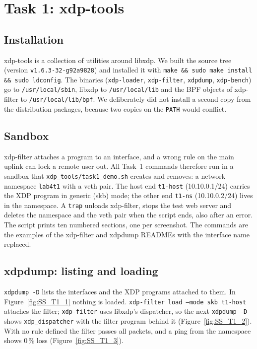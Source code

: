 \chapter{Task 1: xdp-tools}\label{chap:task1}

\section{Installation}
xdp-tools \cite{xdptools_github} is a collection of utilities around libxdp. We built the source tree (version \texttt{v1.6.3-32-g92a9828}) and installed it with \texttt{make \&\& sudo make install \&\& sudo ldconfig}. The binaries (\texttt{xdp-loader}, \texttt{xdp-filter}, \texttt{xdpdump}, \texttt{xdp-bench}) go to \texttt{/usr/local/sbin}, libxdp to \texttt{/usr/local/lib} and the BPF objects of xdp-filter to \texttt{/usr/local/lib/bpf}. We deliberately did not install a second copy from the distribution packages, because two copies on the \texttt{PATH} would conflict.

\section{Sandbox}
xdp-filter attaches a program to an interface, and a wrong rule on the main uplink can lock a remote user out. All Task~1 commands therefore run in a sandbox that \texttt{xdp\_tools/task1\_demo.sh} creates and removes: a network namespace \texttt{lab4t1} with a veth pair. The host end \texttt{t1-host} (10.10.0.1/24) carries the XDP program in generic (skb) mode; the other end \texttt{t1-ns} (10.10.0.2/24) lives in the namespace. A \texttt{trap} unloads xdp-filter, stops the test web server and deletes the namespace and the veth pair when the script ends, also after an error. The script prints ten numbered sections, one per screenshot. The commands are the examples of the xdp-filter and xdpdump READMEs with the interface name replaced.

\section{xdpdump: listing and loading}
\texttt{xdpdump -D} lists the interfaces and the XDP programs attached to them. In Figure~\ref{fig:SS_T1_1} nothing is loaded. \texttt{xdp-filter load --mode skb t1-host} attaches the filter; \texttt{xdp-filter} uses libxdp's dispatcher, so the next \texttt{xdpdump -D} shows \texttt{xdp\_dispatcher} with the filter program behind it (Figure~\ref{fig:SS_T1_2}). With no rule defined the filter passes all packets, and a ping from the namespace shows 0\,\% loss (Figure~\ref{fig:SS_T1_3}).

